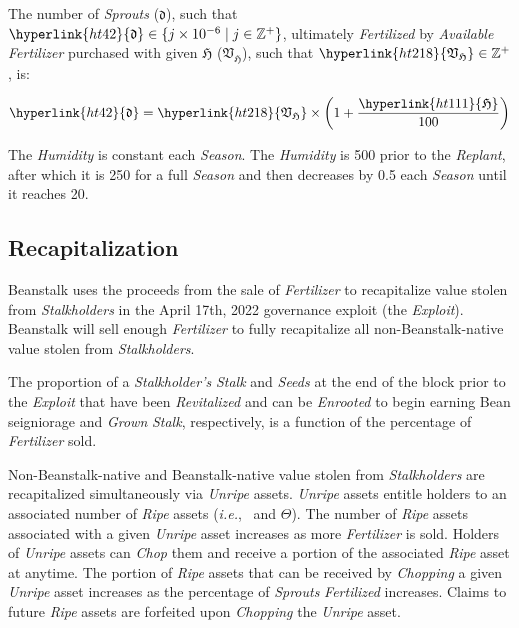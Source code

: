 \documentclass[tikz]{article}
\newcommand{\term}[1]{\textsl{#1}}
\newcommand{\Bean}{} %
\begin{document}
The number of \term{Sprouts} (\hyperlink{ht42}{$\mathfrak{d}$}), such that $\hyperlink{ht42}{\mathfrak{d}} \in \{j \times 10^{-6} \mid j \in \mathbb{Z}^{+} \}$, ultimately \term{Fertilized} by \term{Available} \term{Fertilizer} purchased with given \hyperlink{ht111}{$\mathfrak{H}$} (\hyperlink{ht218}{$\mathfrak{V}_\mathfrak{H}$}), such that $\hyperlink{ht218}{\mathfrak{V}_\mathfrak{H}} \in \mathbb{Z}^{+}$, is:

    $$
        \hyperlink{ht42}{\mathfrak{d}} = 
            \hyperlink{ht218}{\mathfrak{V}_\mathfrak{H}} \times 
                \left(1 + \frac{\hyperlink{ht111}
                            {\mathfrak{H}}}{100}\right)
    $$
    
The \term{Humidity} is constant each \term{Season}. The \term{Humidity} is 500 prior to the \term{Replant}, after which it is 250 for a full \term{Season} and then decreases by 0.5 each \term{Season} until it reaches 20.


\subsection{Recapitalization}

Beanstalk uses the proceeds from the sale of \term{Fertilizer} to recapitalize value stolen from \term{Stalkholders} in the April 17th, 2022 governance exploit (the \term{Exploit}). Beanstalk will sell enough \term{Fertilizer} to fully recapitalize all non-Beanstalk-native value stolen from \term{Stalkholders}. 

The proportion of a \term{Stalkholder's} \term{Stalk} and \term{Seeds} at the end of the block prior to the \term{Exploit} that have been \term{Revitalized} and can be \term{Enrooted} to begin earning Bean seigniorage and \term{Grown} \term{Stalk}, respectively, is a function of the percentage of \term{Fertilizer} sold.

Non-Beanstalk-native and Beanstalk-native value stolen from \term{Stalkholders} are recapitalized simultaneously via \term{Unripe} assets. \term{Unripe} assets entitle holders to an associated number of \term{Ripe} assets (\term{i.e.}, \Bean\ and $\Theta$). The number of \term{Ripe} assets associated with a given \term{Unripe} asset increases as more \term{Fertilizer} is sold. Holders of \term{Unripe} assets can \term{Chop} them and receive a portion of the associated \term{Ripe} asset at anytime. The portion of \term{Ripe} assets that can be received by \term{Chopping} a given \term{Unripe} asset increases as the percentage of \term{Sprouts} \term{Fertilized} increases. Claims to future \term{Ripe} assets are forfeited upon \term{Chopping} the \term{Unripe} asset. 
\end{document}
